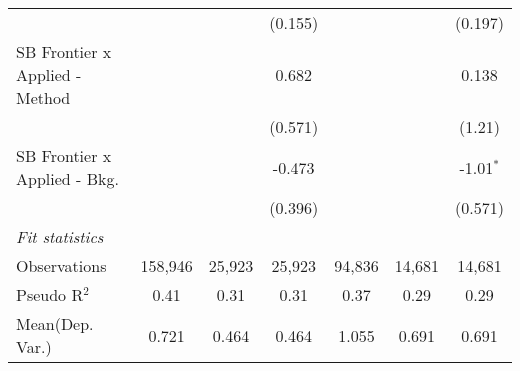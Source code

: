 \begin{tabular}{lcccccc}
                                  &              &               & (0.155)       &               &                & (0.197)\\   
   SB Frontier x Applied - Method &              &               & 0.682         &               &                & 0.138\\   
                                  &              &               & (0.571)       &               &                & (1.21)\\   
   SB Frontier x Applied - Bkg.   &              &               & -0.473        &               &                & -1.01$^{*}$\\   
                                  &              &               & (0.396)       &               &                & (0.571)\\   
   \midrule
   \emph{Fit statistics}\\
   Observations                   & 158,946      & 25,923        & 25,923        & 94,836        & 14,681         & 14,681\\  
   Pseudo R$^2$                   & 0.41         & 0.31          & 0.31          & 0.37          & 0.29           & 0.29\\  
Mean(Dep. Var.) & 0.721 & 0.464 & 0.464 & 1.055 & 0.691 & 0.691 \\
   

\end{tabular}
